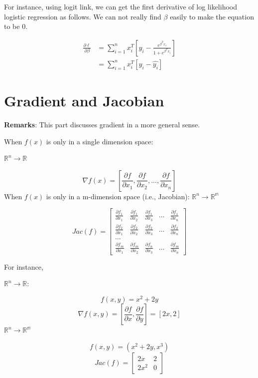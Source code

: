 \documentclass[]{book}
\begin{document}
For instance, using logit link, we can get the first derivative of log
likelihood logistic regression as follows. We can not really find
\(\beta\) easily to make the equation to be 0.

\[\begin{aligned}
\frac{\partial \ell} {\partial \beta} 
&= \sum_{i=1}^{n}x_i^T[y_i-\frac{e^{\beta^Tx_i}}{1+e^{\beta^Tx_i}}] \\
&=\sum_{i=1}^{n} x_i^T[y_i-\hat{y_i}]
\end{aligned}\]

\section{Gradient and Jacobian}\label{gradient-and-jacobian}

\textbf{Remarks}: This part discusses gradient in a more general sense.

When \(f(x)\) is only in a single dimension space:

\(\mathbb{R}^n \rightarrow \mathbb{R}\)

\[\nabla f(x)=[\frac{\partial f}{\partial x_1},\frac{\partial f}{\partial x_2},...,\frac{\partial f}{\partial x_n}]\]
When \(f(x)\) is only in a m-dimension space (i.e., Jacobian):
\(\mathbb{R}^n \rightarrow \mathbb{R^m}\)

\[Jac(f)=\begin{bmatrix}
\frac{\partial f_1}{\partial x_1} & \frac{\partial f_1}{\partial x_2} & \frac{\partial f_1}{\partial x_3} & ... & \frac{\partial f_1}{\partial x_n}\\
\frac{\partial f_2}{\partial x_1} & \frac{\partial f_2}{\partial x_2} & \frac{\partial f_2}{\partial x_3} & ... & \frac{\partial f_2}{\partial x_n} \\
...\\
\frac{\partial f_m}{\partial x_1} & \frac{\partial f_m}{\partial x_2} & \frac{\partial f_n}{\partial x_3} & ... & \frac{\partial f_m}{\partial x_n}
\end{bmatrix}\]

For instance,

\(\mathbb{R}^n \rightarrow \mathbb{R}\):

\[f(x,y)=x^2+2y\]
\[\nabla f(x,y)=[\frac{\partial f}{\partial x},\frac{\partial f}{\partial y}]=[2x,2]\]
\(\mathbb{R}^n \rightarrow \mathbb{R^m}\)

\[f(x,y)=(x^2+2y,x^3)\] \[Jac(f)=\begin{bmatrix}
2x & 2\\
2x^2 & 0 
\end{bmatrix}\]
\end{document}
